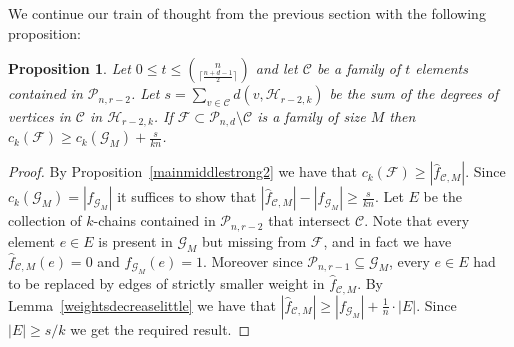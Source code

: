 \documentclass[12pt]{article}
\newtheorem{prop}[theorem]{Proposition}
\numberwithin{equation}{section}
\def\C{\mathcal{C}}
\def\F{\mathcal{F}}
\def\G{\mathcal{G}}
\def\HH{\mathcal{H}}
\def\P{\mathcal{P}}
\def\xyz{\frac{s}{kn}}
\begin{document}
We continue our train of thought from the previous section with the following proposition:
\begin{prop}\label{tmissing}
Let $0\leq t\leq \binom{n}{\lceil \frac{n+d-1}{2}\rceil}$ and let $\C$ be a family of $t$ elements contained in $\P_{n,r-2}$. Let $s=\sum_{v\in \C}d(v,\HH_{r-2,k})$ be the sum of the degrees of vertices in $\C$ in $\HH_{r-2,k}$. If $\F\subset \P_{n,d}\setminus \C$ is a family of size $M$ then $c_k(\F)\geq c_k(\G_M)+\xyz$.
\end{prop}
\begin{proof}
By Proposition~\ref{mainmiddlestrong2} we have that $c_k(\F)\geq |\hat{f}_{\C,M}|$. Since $c_k(\G_M)=|f_{\G_M}|$  it suffices to show that $|\hat{f}_{\C,M}|-|f_{\G_M}|\geq \xyz$. Let $E$ be the collection of $k$-chains contained in $\P_{n,r-2}$ that intersect $\C$. Note that every element $e\in E$ is present in $\G_M$ but missing from $\F$, and in fact we have $\hat{f}_{\C,M}(e)=0$ and $f_{\G_M}(e)=1$. Moreover since  $\P_{n,r-1}\subseteq \G_M$, every $e\in E$ had to be replaced by edges of strictly smaller weight in $\hat{f}_{\C,M}$. By Lemma~\ref{weightsdecreaselittle} we have that $|\hat{f}_{\C,M}|\geq |f_{\G_M}|+ \frac{1}{n}\cdot |E|$. Since $|E|\geq s/k$ we get the required result.
\end{proof}
\end{document}
